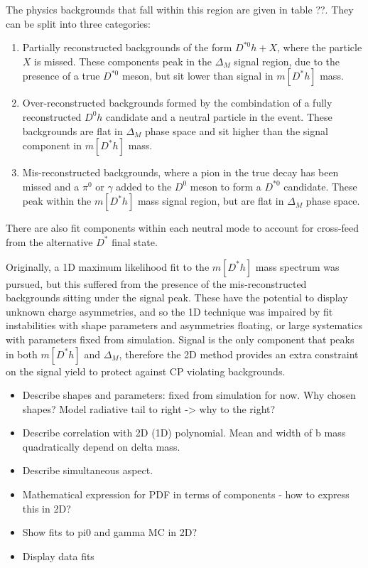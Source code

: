 \documentclass[oneside,12pt]{article}
\begin{document}
The physics backgrounds that fall within this region are given in table ??. They
can be split into three categories:
\begin{enumerate}
  \item Partially reconstructed backgrounds of the form $D^{*0}h+X$, where the
  particle $X$ is missed. These components peak in the $\Delta_M$ signal region,
  due to the presence of a true $D^{*0}$ meson, but sit lower than signal in
  $m[D^*h]$ mass.
  \item Over-reconstructed backgrounds formed by the combindation of a fully
  reconstructed $D^0h$ candidate and a neutral particle in the event. These
  backgrounds are flat in $\Delta_M$ phase space and sit higher than the signal
  component in $m[D^*h]$ mass.
  \item Mis-reconstructed backgrounds, where a pion in the true decay has been missed and
  a $\pi^0$ or $\gamma$ added to the $D^0$ meson to form a $D^{*0}$ candidate.
  These peak within the $m[D^*h]$ mass signal region, but are flat in $\Delta_M$
  phase space.
\end{enumerate}

There are also fit components within each neutral mode to account for
cross-feed from the alternative $D^*$ final state. 

Originally, a 1D maximum likelihood fit to the $m[D^*h]$ mass spectrum was
pursued, but this suffered from the presence of the mis-reconstructed
backgrounds sitting under the signal peak. These have the potential to display
unknown charge asymmetries, and so the 1D technique was impaired by fit
instabilities with shape parameters and asymmetries floating, or large
systematics with parameters fixed from simulation. Signal is the only component
that peaks in both $m[D^*h]$ and $\Delta_M$, therefore the 2D method provides an
extra constraint on the signal yield to protect against CP violating
backgrounds.

\begin{itemize}
\item Describe shapes and parameters: fixed from simulation for now. Why chosen
shapes? Model radiative tail to right -> why to the right?
\item Describe correlation with 2D (1D) polynomial. Mean and width of b mass
quadratically depend on delta mass.
\item Describe simultaneous aspect.
\item Mathematical expression for PDF in terms of components - how to express
this in 2D?
\item Show fits to pi0 and gamma MC in 2D?
\\
\item Display data fits
\end{itemize}
\end{document}
